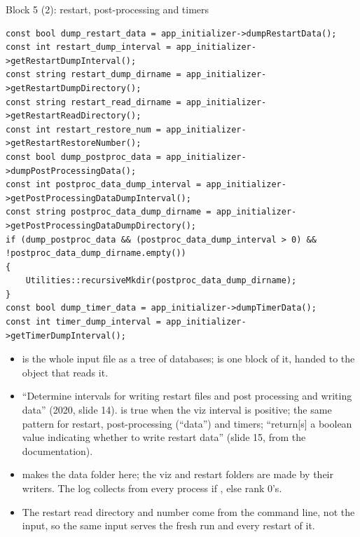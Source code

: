 \documentclass[aspectratio=169,11pt]{beamer}
\begin{document}
\begin{frame}[fragile]{Block 5 (2): restart, post-processing and timers}
\label{fr:appinit2}
\begin{lstlisting}[style=cpptiny]
const bool dump_restart_data = app_initializer->dumpRestartData();
const int restart_dump_interval = app_initializer->getRestartDumpInterval();
const string restart_dump_dirname = app_initializer->getRestartDumpDirectory();
const string restart_read_dirname = app_initializer->getRestartReadDirectory();
const int restart_restore_num = app_initializer->getRestartRestoreNumber();
const bool dump_postproc_data = app_initializer->dumpPostProcessingData();
const int postproc_data_dump_interval = app_initializer->getPostProcessingDataDumpInterval();
const string postproc_data_dump_dirname = app_initializer->getPostProcessingDataDumpDirectory();
if (dump_postproc_data && (postproc_data_dump_interval > 0) && !postproc_data_dump_dirname.empty())
{
    Utilities::recursiveMkdir(postproc_data_dump_dirname);
}
const bool dump_timer_data = app_initializer->dumpTimerData();
const int timer_dump_interval = app_initializer->getTimerDumpInterval();
\end{lstlisting}
\scriptsize
\begin{itemize}
  \item {} is the whole input file as a tree of databases;  is one block of it, handed to the object that reads it.
  \item ``Determine intervals for writing restart files and post processing and writing data'' (2020, slide 14).  is true when the viz interval is positive; the same pattern for restart, post-processing (``data'') and timers;  ``return[s] a boolean value indicating whether to write restart data'' (slide 15, from the documentation).
  \item {} makes the data folder here; the viz and restart folders are made by their writers. The log collects  from every process if , else rank $0$'s.
  \item The restart read directory and number come from the command line, not the input, so the same input serves the fresh run and every restart of it.
\end{itemize}
\end{frame}
\end{document}
